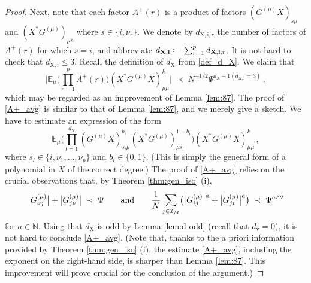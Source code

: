 \documentclass[11pt]{article} %
\numberwithin{equation}{section}
\numberwithin{figure}{section}
\theoremstyle{plain} %
\theoremstyle{definition} %
\newcommand{\f}[1]{\boldsymbol{\mathrm{#1}}} %
\renewcommand{\cal}{\mathcal}
\newcommand{\txt}[1]{\text{\rm{#1}}}
\newcommand{\E}{\mathbb{E}}
\newcommand{\N}{\mathbb{N}}
\newcommand*{\deq}{\mathrel{\vcenter{\baselineskip0.65ex \lineskiplimit0pt \hbox{.}\hbox{.}}}=}
\renewcommand{\leq}{\leqslant}
\newcommand{\ind}[1]{\f 1 (#1)}
\newcommand{\pb}[1]{\bigl({#1}\bigr)}
\newcommand{\pBB}[1]{\Biggl({#1}\Biggr)}
\newcommand{\absb}[1]{\bigl\lvert #1 \bigr\rvert}
\newcommand{\absBB}[1]{\Biggl\lvert #1 \Biggr\rvert}
\begin{document}
\begin{proof}
Next, note that each factor $A^+(r)$ is a product of factors $(G^{(\mu)} X)_{s \mu}$ and $(X^* G^{(\mu)})_{\mu s}$ where $s \in \{i,\nu_r\}$. We denote by $d_{\f X, \f i, r}$ the number of factors of $A^+(r)$ for which $s = i$, and abbreviate $d_{\f X, \f i} \deq \sum_{r = 1}^p d_{\f X, \f i, r}$. It is not hard to check that $d_{\f X, \f i} \leq 3$. Recall the definition of $d_{\f X}$ from \eqref{def_d_X}. We claim that
\begin{equation} \label{A+_avg}
\absBB{\E_\mu \pBB{\prod_{r = 1}^{p} A^{+}(r)} (X^* G^{(\mu)} X)_{\mu \mu}^k} \;\prec\; N^{-1/2} \Psi^{d_{\f X} - \ind{d_{\f X, \f i} = 3}}\,,
\end{equation}
which may be regarded as an improvement of Lemma \ref{lem:87}.
The proof of \eqref{A+_avg} is similar to that of Lemma \ref{lem:87}, and we merely give a sketch. We have to estimate an expression of the form
\begin{equation*}
\E_\mu \pBB{\prod_{l = 1}^{d_{\f X}} (G^{(\mu)} X)_{s_l \mu}^{b_i} (X^* G^{(\mu)})_{\mu s_l}^{1 - b_i}} (X^* G^{(\mu)} X)_{\mu \mu}^k\,,
\end{equation*}
where $s_l \in \{i,\nu_1, \dots, \nu_p\}$ and $b_i \in \{0,1\}$. (This is simply the general form of a polynomial in $X$ of the correct degree.) The proof of \eqref{A+_avg} relies on the crucial observations that, by Theorem \ref{thm:gen_iso} (i),
\begin{equation*}
\absb{G^{(\mu)}_{\nu j}} + \absb{G^{(\mu)}_{j \nu}} \;\prec\; \Psi \qquad\txt{and} \qquad  \frac{1}{N} \sum_{j \in \cal I_M} \pb{\absb{G^{(\mu)}_{i j}}^a + \absb{G^{(\mu)}_{ji}}^a} \;\prec\; \Psi^{a \wedge 2}
\end{equation*}
for $a \in \N$. Using that $d_{\f X}$ is odd by Lemma \ref{lem:d odd} (recall that $d_{\f v} = 0$), it is not hard to conclude \eqref{A+_avg}. (Note that, thanks to the a priori information provided by Theorem \ref{thm:gen_iso} (i), the estimate \eqref{A+_avg}, including the exponent on the right-hand side, is sharper than Lemma \ref{lem:87}. This improvement will prove crucial for the conclusion of the argument.)


\end{proof}
\end{document}
